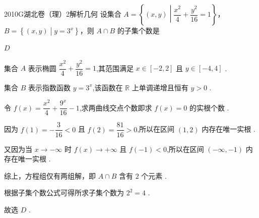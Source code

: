 
\begin{problem}{2010}{G}{湖北卷（理）}{2}{解析几何}
设集合 $ A=\left\{(x,y)\middle|\dfrac{x^2}{4}+\dfrac{y^2}{16}=1\right\} $，$ B=\left\{(x,y)\middle|y=3^x\right\} $，则 $ A\cap B $ 的子集个数是
\begin{choices}
\end{choices}
\end{problem}

\begin{answer}
$D$
\end{answer}

\begin{solutions}
集合 $A$ 表示椭圆 $\displaystyle\dfrac{x^2}{4}+\displaystyle\dfrac{y^2}{16}=1$,其范围满足 $x\in[-2,2]$ 且 $y\in[-4,4]$ .

集合 $B$ 表示指数函数 $y=3^x$,该函数在 $\mathbb{R}$ 上单调递增且恒有 $y>0$ .

令 $f(x)=\displaystyle\dfrac{x^2}{4}+\displaystyle\dfrac{9^x}{16}-1$,求两曲线交点个数即求 $f(x)=0$ 的实根个数 .

因为 $f(1)=-\displaystyle\dfrac{3}{16}<0$ 且 $f(2)=\displaystyle\dfrac{81}{16}>0$,所以在区间 $(1,2)$ 内存在唯一实根 .

又因为当 $x\to-\infty$ 时 $f(x)\to+\infty$ 且 $f(-1)<0$,所以在区间 $(-\infty,-1)$ 内存在唯一实根 .

综上，方程组仅有两组解，即 $A\cap B$ 含有 $2$ 个元素 .

根据子集个数公式可得所求子集个数为 $2^2=4$ .

故选 $\boxed{D}$ .
\end{solutions}